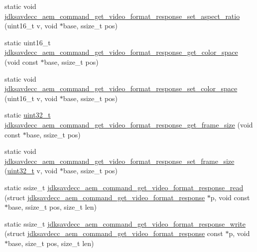 \begin{DoxyCompactItemize}
\item 
static void \hyperlink{group__command__get__video__format__response_gacb2363714e25b9287a76e81233dc65d3}{jdksavdecc\+\_\+aem\+\_\+command\+\_\+get\+\_\+video\+\_\+format\+\_\+response\+\_\+set\+\_\+aspect\+\_\+ratio} (uint16\+\_\+t v, void $\ast$base, ssize\+\_\+t pos)
\item 
static uint16\+\_\+t \hyperlink{group__command__get__video__format__response_ga6e25aee231d1c8c8a546ed7fc11e3ed9}{jdksavdecc\+\_\+aem\+\_\+command\+\_\+get\+\_\+video\+\_\+format\+\_\+response\+\_\+get\+\_\+color\+\_\+space} (void const $\ast$base, ssize\+\_\+t pos)
\item 
static void \hyperlink{group__command__get__video__format__response_ga698ebea4c0cc9f95edae4ff2d4b32b60}{jdksavdecc\+\_\+aem\+\_\+command\+\_\+get\+\_\+video\+\_\+format\+\_\+response\+\_\+set\+\_\+color\+\_\+space} (uint16\+\_\+t v, void $\ast$base, ssize\+\_\+t pos)
\item 
static \hyperlink{parse_8c_a6eb1e68cc391dd753bc8ce896dbb8315}{uint32\+\_\+t} \hyperlink{group__command__get__video__format__response_ga07684eb406861581e8ccdb4b4ceb8d89}{jdksavdecc\+\_\+aem\+\_\+command\+\_\+get\+\_\+video\+\_\+format\+\_\+response\+\_\+get\+\_\+frame\+\_\+size} (void const $\ast$base, ssize\+\_\+t pos)
\item 
static void \hyperlink{group__command__get__video__format__response_ga01a56fa80faf4cee401370b28132de6d}{jdksavdecc\+\_\+aem\+\_\+command\+\_\+get\+\_\+video\+\_\+format\+\_\+response\+\_\+set\+\_\+frame\+\_\+size} (\hyperlink{parse_8c_a6eb1e68cc391dd753bc8ce896dbb8315}{uint32\+\_\+t} v, void $\ast$base, ssize\+\_\+t pos)
\item 
static ssize\+\_\+t \hyperlink{group__command__get__video__format__response_ga847f79f924389ac28875a9d586171930}{jdksavdecc\+\_\+aem\+\_\+command\+\_\+get\+\_\+video\+\_\+format\+\_\+response\+\_\+read} (struct \hyperlink{structjdksavdecc__aem__command__get__video__format__response}{jdksavdecc\+\_\+aem\+\_\+command\+\_\+get\+\_\+video\+\_\+format\+\_\+response} $\ast$p, void const $\ast$base, ssize\+\_\+t pos, size\+\_\+t len)
\item 
static ssize\+\_\+t \hyperlink{group__command__get__video__format__response_gaf6d53e5e32e09493485f38b58259e979}{jdksavdecc\+\_\+aem\+\_\+command\+\_\+get\+\_\+video\+\_\+format\+\_\+response\+\_\+write} (struct \hyperlink{structjdksavdecc__aem__command__get__video__format__response}{jdksavdecc\+\_\+aem\+\_\+command\+\_\+get\+\_\+video\+\_\+format\+\_\+response} const $\ast$p, void $\ast$base, size\+\_\+t pos, size\+\_\+t len)
\end{DoxyCompactItemize}


